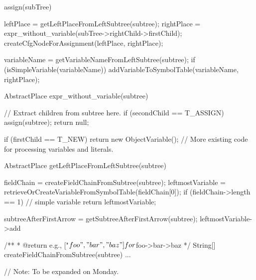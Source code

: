 \begin{textcode}
assign(subTree) {
  leftPlace = getLeftPlaceFromLeftSubtree(subtree);
  rightPlace = expr_without_variable(subTree->rightChild->firstChild);
  createCfgNodeForAssignment(leftPlace, rightPlace);

  variableName = getVariableNameFromLeftSubtree(subtree);
  if (isSimpleVariable(variableName)) {
    addVariableToSymbolTable(variableName, rightPlace);
  }
}

AbstractPlace expr_without_variable(subtree) {
  // Extract children from subtree here.
  if (secondChild == T_ASSIGN) {
    assign(subtree);
   return null;
  }

  if (firstChild == T_NEW) {
    return new ObjectVariable();
  }
  // More existing code for processing variables and literals.
}

AbstractPlace getLeftPlaceFromLeftSubtree(subtree) {
  fieldChain = createFieldChainFromSubtree(subtree);
  leftmostVariable = retrieveOrCreateVariableFromSymbolTable(fieldChain[0]);
  if (fieldChain->length == 1) {
    // simple variable
    return leftmostVariable;
  }

  subtreeAfterFirstArrow = getSubtreeAfterFirstArrow(subtree);
  leftmostVariable->add
}

/**
 * @return e.g., ["$foo", "bar", "baz"] for $foo->bar->baz
 */
String[] createFieldChainFromSubtree(subtree) {
  ...
}

// Note: To be expanded on Monday.

\end{textcode}
